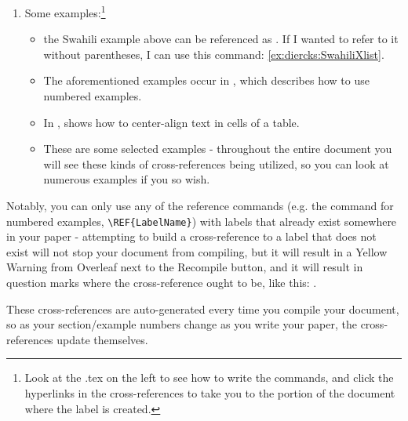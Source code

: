 \documentclass[output=paper,colorlinks,citecolor=brown]{langscibook}
\begin{document}
\begin{enumerate}
\begin{itemize}
\end{itemize}

\item Some examples:\footnote{Look at the .tex on the left to see how to write the commands, and click the hyperlinks in the cross-references to take you to the portion of the document where the label is created.}

\begin{itemize}

\item the Swahili example above can be referenced as . If I wanted to refer to it without parentheses, I can use this command: \ref{ex:diercks:SwahiliXlist}.

\item The aforementioned examples occur in , which describes how to use numbered examples.

\item  In ,   shows how to center-align text in cells of a table.

\item These are some selected examples - throughout the entire document you will see these kinds of cross-references being utilized, so you can look at numerous examples if you so wish.

\end{itemize}

\end{enumerate}

Notably, you can only use any of the reference commands (e.g. the command for numbered examples, \verb|\REF{LabelName}|) with labels that already exist somewhere in your paper - attempting to build a cross-reference to a label that does not exist will not stop your document from compiling, but it will result in a Yellow Warning from Overleaf next to the Recompile button, and it will result in question marks where the cross-reference ought to be, like this: . %

These cross-references are auto-generated every time you compile your document, so as your section/example numbers change as you write your paper, the cross-references update themselves. 
\end{document}
